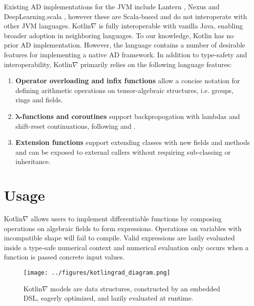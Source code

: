 \documentclass{article}
\begin{document}
Existing AD implementations for the JVM include Lantern \cite{DBLP:journals_corr_abs-1803-10228}, Nexus \cite{chen2017typesafe} and DeepLearning.scala \cite{dl4s}, however these are Scala-based and do not interoperate with other JVM languages. Kotlin$\nabla$ is fully interoperable with vanilla Java, enabling broader adoption in neighboring languages. To our knowledge, Kotlin has no prior AD implementation. However, the language contains a number of desirable features for implementing a native AD framework. In addition to type-safety and interoperability, Kotlin$\nabla$ primarily relies on the following language features:
\begin{enumerate}[itemsep=-0.5ex]
  \item \textbf{Operator overloading and infix functions} allow a concise notation for defining arithmetic operations on tensor-algebraic structures, i.e. groups, rings and fields.
  \item \textbf{$\mathbf{\lambda}$-functions and coroutines} support backpropogation with lambdas and shift-reset continuations, following \citealt{pearlmutter2008reverse} and \citealt{DBLP:journals_corr_abs-1803-10228}.
  \item \textbf{Extension functions} support extending classes with new fields and methods and can be exposed to external callers without requiring sub-classing or inheritance.
\end{enumerate}
\squeezeup\squeezeup
\section{Usage}

Kotlin$\nabla$ allows users to implement differentiable functions by composing operations on algebraic fields to form expressions. Operations on variables with incompatible shape will fail to compile. Valid expressions are lazily evaluated inside a type-safe numerical context and numerical evaluation only occurs when a function is passed concrete input values.

\squeezeup\begin{figure}[!htb]
\texttt{[image: ../figures/kotlingrad\_diagram.png]}
\squeezeup\caption{Kotlin$\nabla$ models are data structures, constructed by an embedded DSL, eagerly optimized, and lazily evaluated at runtime.}\squeezeup
\end{figure}
\end{document}
